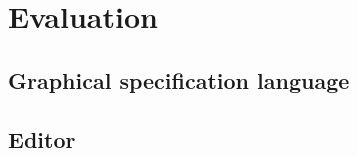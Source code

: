 \chapter{Evaluation}
\label{evaluation}


\section{Graphical specification language}


\section{Editor}

